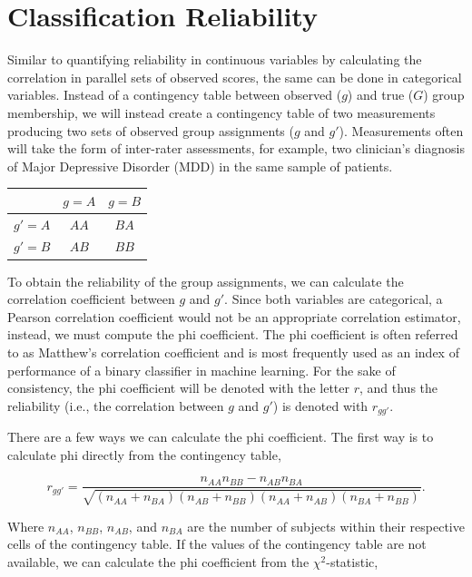 \documentclass[
  letterpaper,
  DIV=11,
  numbers=noendperiod]{scrreprt}
\begin{document}
\hypertarget{classification-reliability}{%
\section{Classification Reliability}\label{classification-reliability}}

Similar to quantifying reliability in continuous variables by
calculating the correlation in parallel sets of observed scores, the
same can be done in categorical variables. Instead of a contingency
table between observed (\(g\)) and true (\(G\)) group membership, we
will instead create a contingency table of two measurements producing
two sets of observed group assignments (\(g\) and \(g'\)). Measurements
often will take the form of inter-rater assessments, for example, two
clinician's diagnosis of Major Depressive Disorder (MDD) in the same
sample of patients.

\begin{longtable}[]{@{}ccc@{}}
\toprule\noalign{}
& \(g=A\) & \(g=B\) \\
\midrule\noalign{}
\endhead
\bottomrule\noalign{}
\endlastfoot
\(g'=A\) & \(AA\) & \(BA\) \\
\(g'=B\) & \(AB\) & \(BB\) \\
\end{longtable}

To obtain the reliability of the group assignments, we can calculate the
correlation coefficient between \(g\) and \(g'\). Since both variables
are categorical, a Pearson correlation coefficient would not be an
appropriate correlation estimator, instead, we must compute the phi
coefficient. The phi coefficient is often referred to as Matthew's
correlation coefficient and is most frequently used as an index of
performance of a binary classifier in machine learning. For the sake of
consistency, the phi coefficient will be denoted with the letter \(r\),
and thus the reliability (i.e., the correlation between \(g\) and
\(g'\)) is denoted with \(r_{gg'}\).

There are a few ways we can calculate the phi coefficient. The first way
is to calculate phi directly from the contingency table,

\[
r_{gg'} = \frac{n_{AA}n_{BB}-n_{AB}n_{BA}}{\sqrt{(n_{AA}+n_{BA})(n_{AB}+n_{BB})(n_{AA}+n_{AB})(n_{BA}+n_{BB})}}.
\]

Where \(n_{AA}\), \(n_{BB}\), \(n_{AB}\), and \(n_{BA}\) are the number
of subjects within their respective cells of the contingency table. If
the values of the contingency table are not available, we can calculate
the phi coefficient from the \(\chi^2\)-statistic,
\end{document}
